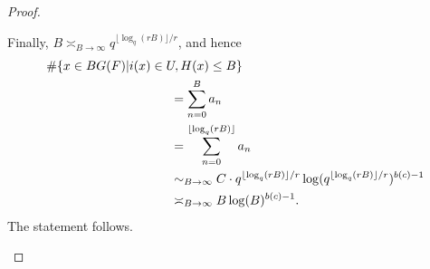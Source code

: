\documentclass[a4paper,english,12pt]{amsart}
\newcommand{\QQ}{\mathbb{Q}}
\newcommand{\oF}{\overline F}
\DeclareMathOperator{\Frob}{Frob}
\numberwithin{equation}{subsection}
\begin{document}
\begin{proof}
\begin{enumerate}
Finally, $B\asymp_{B\to\infty} q^{\lfloor\log_{q}(rB)\rfloor/r}$, and hence 
\begin{align*}
\#\{x\in BG(F)|i(x)\in U, H(x)\leq B\}\hskip-2cm&\\&=\sum_{n=0}^Ba_n\\&=\sum_{n=0}^{\lfloor\log_{q}(rB)\rfloor}a_n\\
&\sim_{B\to\infty}C\cdot q^{\lfloor \log_{q}(rB)\rfloor/r}\log(q^{\lfloor\log_{q}(rB) \rfloor/r})^{b(c)-1}\\
&\asymp_{B\to\infty} B\log(B)^{b(c)-1}.
\end{align*}
The statement follows.
\end{enumerate}
\end{proof}
\end{document}
